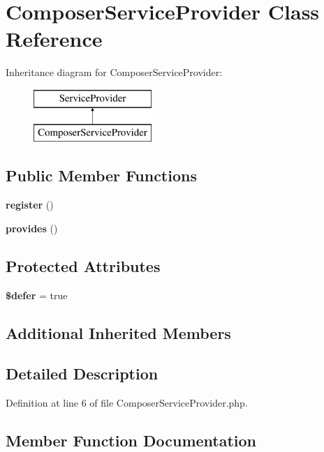 \section{Composer\+Service\+Provider Class Reference}
\label{class_illuminate_1_1_foundation_1_1_providers_1_1_composer_service_provider}
Inheritance diagram for Composer\+Service\+Provider\+:\begin{figure}[H]
\begin{center}
\leavevmode
\includegraphics[height=2.000000cm]{class_illuminate_1_1_foundation_1_1_providers_1_1_composer_service_provider}
\end{center}
\end{figure}
\subsection*{Public Member Functions}
\begin{DoxyCompactItemize}
\item 
{\bf register} ()
\item 
{\bf provides} ()
\end{DoxyCompactItemize}
\subsection*{Protected Attributes}
\begin{DoxyCompactItemize}
\item 
{\bf \$defer} = true
\end{DoxyCompactItemize}
\subsection*{Additional Inherited Members}


\subsection{Detailed Description}


Definition at line 6 of file Composer\+Service\+Provider.\+php.



\subsection{Member Function Documentation}
